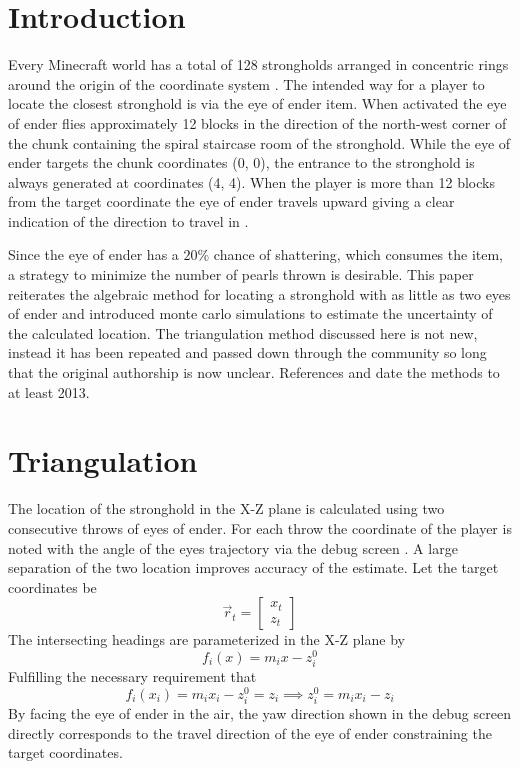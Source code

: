 \documentclass[a4paper,10pt]{article}
\begin{document}
\begin{multicols}{2}

    \section{Introduction}
    Every Minecraft world has a total of 128 strongholds arranged in concentric rings around the origin of the coordinate system \cite{wiki_stronghold}.
    The intended way for a player to locate the closest stronghold is via the eye of ender item.
    When activated the eye of ender flies approximately 12 blocks in the direction of the north-west corner of the chunk containing the spiral staircase room of the stronghold.
    While the eye of ender targets the chunk coordinates (0, 0), the entrance to the stronghold is always generated at coordinates (4, 4).
    When the player is more than 12 blocks from the target coordinate the eye of ender travels upward giving a clear indication of the direction to travel in \cite{wiki_endereye}.

    Since the eye of ender has a $20\unit{\%}$ chance of shattering, which consumes the item, a strategy to minimize the number of pearls thrown is desirable.
    This paper reiterates the algebraic method for locating a stronghold with as little as two eyes of ender and introduced monte carlo simulations to estimate the uncertainty of the calculated location.
    The triangulation method discussed here is not new, instead it has been repeated and passed down through the community so long that the original authorship is now unclear.
    References \cite{tutorial_goosen} and \cite{tutorial_ben} date the methods to at least 2013.

    \section{Triangulation}
    The location of the stronghold in the X-Z plane is calculated using two consecutive throws of eyes of ender.
    For each throw the coordinate of the player is noted with the angle of the eyes trajectory via the debug screen \cite{wiki_debugscreen}.
    A large separation of the two location improves accuracy of the estimate.
    Let the target coordinates be
    \begin{equation}
        \vec{r}_t = \begin{bmatrix}
            x_t\\z_t
        \end{bmatrix}
    \end{equation}
    The intersecting headings are parameterized in the X-Z plane by
    \begin{equation}
        f_i(x) = m_i x - z_i^0
    \end{equation}
    Fulfilling the necessary requirement that
    \begin{equation}
        f_i(x_i) = m_i x_i - z_i^0 = z_i \implies z_i^0 = m_i x_i - z_i
    \end{equation}
    By facing the eye of ender in the air, the yaw direction shown in the debug screen directly corresponds to the travel direction of the eye of ender constraining the target coordinates.
    

\end{multicols}
\end{document}
